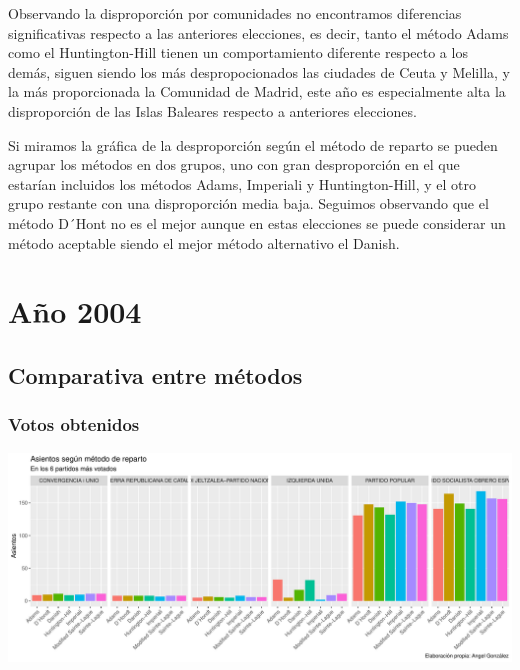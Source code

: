 \documentclass[12pt,a4paper,]{book}
\numberwithin{dummy}{section}
\theoremstyle{ocrenumbox}
\theoremstyle{blacknumex}
\theoremstyle{blacknumbox}
\theoremstyle{ocrenum}
\theoremstyle{ocrenum}
\begin{document}
Observando la disproporción por comunidades no encontramos diferencias
significativas respecto a las anteriores elecciones, es decir, tanto el
método Adams como el Huntington-Hill tienen un comportamiento diferente
respecto a los demás, siguen siendo los más despropocionados las
ciudades de Ceuta y Melilla, y la más proporcionada la Comunidad de
Madrid, este año es especialmente alta la disproporción de las Islas
Baleares respecto a anteriores elecciones.

Si miramos la gráfica de la desproporción según el método de reparto se
pueden agrupar los métodos en dos grupos, uno con gran desproporción en
el que estarían incluidos los métodos Adams, Imperiali y
Huntington-Hill, y el otro grupo restante con una disproporción media
baja. Seguimos observando que el método D´Hont no es el mejor aunque en
estas elecciones se puede considerar un método aceptable siendo el mejor
método alternativo el Danish.

\hypertarget{auxf1o-2004}{%
\section{Año 2004}\label{auxf1o-2004}}

\hypertarget{comparativa-entre-muxe9todos-8}{%
\subsection{Comparativa entre
métodos}\label{comparativa-entre-muxe9todos-8}}

\hypertarget{votos-obtenidos-8}{%
\subsubsection{Votos obtenidos}\label{votos-obtenidos-8}}

\begin{center}\includegraphics[width=0.95\linewidth]{figurasR/unnamed-chunk-131-1} \end{center}
\end{document}
